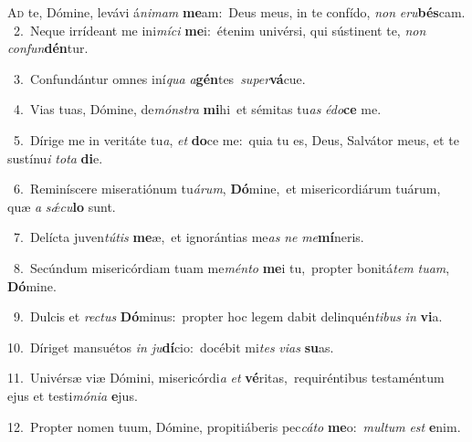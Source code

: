 \lettrine{\initial\textcolor{\initialcolor}{A}}{d} te, Dómine, levávi á\-\textit{ni}\-\textit{mam} \textbf{me}\-am:~\star Deus meus, in te confído, \textit{non} \textit{e}\-\textit{ru}\textbf{bés}cam.\\
{\numbfont\textcolor{\numbcolor}{~2.}}~Neque irrídeant me ini\-\textit{mí}\-\textit{ci} \textbf{me}\-i:~\star étenim univérsi, qui sústinent te, \textit{non} \textit{con}\-\textit{fun}\textbf{dén}tur.\par
{\numbfont\textcolor{\numbcolor}{~3.}}~Confundántur omnes iní\textit{qua} \textit{a}\-\textbf{gén}tes~\star \textit{su}\-\textit{per}\textbf{vá}cue.\par
{\numbfont\textcolor{\numbcolor}{~4.}}~Vias tuas, Dómine, de\-\textit{móns}\-\textit{tra} \textbf{mi}\-hi~\star et sémitas tu\textit{as} \textit{é}\-\textit{do}\textbf{ce} me.\par
{\numbfont\textcolor{\numbcolor}{~5.}}~Dírige me in veritáte tu\-\textit{a}\-, \textit{et} \textbf{do}\-ce me:~\star quia tu es, Deus, Salvátor meus, et te sustínu\textit{i} \textit{to}\-\textit{ta} \textbf{di}\-e.\par
{\numbfont\textcolor{\numbcolor}{~6.}}~Reminíscere miseratiónum tu\-\textit{á}\-\textit{rum}, \textbf{Dó}\-mine,~\star et misericordiárum tuárum, quæ \textit{a} \textit{sǽ}\-\textit{cu}\textbf{lo} sunt.\par
{\numbfont\textcolor{\numbcolor}{~7.}}~Delícta juven\-\textit{tú}\-\textit{tis} \textbf{me}\-æ,~\star et ignorántias me\textit{as} \textit{ne} \textit{me}\-\textbf{mí}neris.\par
{\numbfont\textcolor{\numbcolor}{~8.}}~Secúndum misericórdiam tuam me\-\textit{mén}\-\textit{to} \textbf{me}\-i tu,~\star propter bonitá\textit{tem} \textit{tu}\-\textit{am}, \textbf{Dó}\-mine.\par
{\numbfont\textcolor{\numbcolor}{~9.}}~Dulcis et \textit{rec}\-\textit{tus} \textbf{Dó}\-minus:~\star propter hoc legem dabit delinquén\-\textit{ti}\-\textit{bus} \textit{in} \textbf{vi}\-a.\par
{\numbfont\textcolor{\numbcolor}{10.}}~Díriget mansuétos \textit{in} \textit{ju}\-\textbf{dí}cio:~\star docébit mi\textit{tes} \textit{vi}\-\textit{as} \textbf{su}\-as.\par
{\numbfont\textcolor{\numbcolor}{11.}}~Univérsæ viæ Dómini, misericórdi\textit{a} \textit{et} \textbf{vé}\-ritas,~\star requiréntibus testaméntum ejus et testi\-\textit{mó}\-\textit{ni}\textit{a} \textbf{e}\-jus.\par
{\numbfont\textcolor{\numbcolor}{12.}}~Propter nomen tuum, Dómine, propitiáberis pec\-\textit{cá}\-\textit{to} \textbf{me}\-o:~\star \textit{mul}\-\textit{tum} \textit{est} \textbf{e}\-nim.\par
